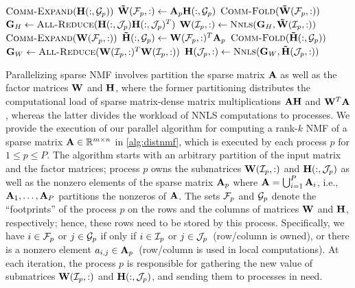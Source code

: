 \begin{algorithm}
\caption{\distspnmf: \distspnmffull}
\label{alg:distnmf}
  \begin{algorithmic}[1]
    \setcounter{ALC@unique}{0}
      \REPEAT
        \STATE $\textsc{Comm-Expand} (\mathbf{H}(:,\mathcal{G}_p))$ \label{line:exph}
        \STATE $\mathbf{\tilde{W}}(\mathcal{F}_p, :) \gets \mathbf{A}_p \mathbf{H}(:, \mathcal{G}_p)$ \label{line:ah}
        \STATE $\textsc{Comm-Fold}(\mathbf{\tilde{W}}(\mathcal{F}_p, :))$ \label{line:foldw}
        \STATE $\mathbf{G}_H \gets \textsc{All-Reduce}(\mathbf{H}(:, \mathcal{J}_p) \mathbf{H}(:, \mathcal{J}_p)^T)$ \label{line:hmgr}
        \STATE $\mathbf{W}(\mathcal{I}_p, :) \gets \textsc{Nnls}(\mathbf{G}_H, \mathbf{\tilde{W}}(\mathcal{I}_p, :))$ \label{line:wmnnls}
        \STATE $\textsc{Comm-Expand}(\mathbf{W}(\mathcal{F}_p, :))$ \label{line:expw}
        \STATE $\mathbf{\tilde{H}}(:, \mathcal{G}_p) \gets \mathbf{W}(\mathcal{F}_p, :)^T \mathbf{A}_p$ \label{line:wta}
        \STATE $\textsc{Comm-Fold}(\mathbf{\tilde{H}}(:, \mathcal{G}_p))$ \label{line:foldh}
        \STATE $\mathbf{G}_W \gets \textsc{All-Reduce}(\mathbf{W}(\mathcal{I}_p, :)^T \mathbf{W}(\mathcal{I}_p, :))$ \label{line:wmgr}
        \STATE $\mathbf{H}(\mathcal{J}_p, :) \gets \textsc{Nnls}(\mathbf{G}_W, \mathbf{\tilde{H}}(\mathcal{J}_p, :))$ \label{line:hmnnls}
  \end{algorithmic}
\end{algorithm}

Parallelizing sparse NMF involves partition the sparse matrix $\mathbf{A}$ as well as the factor matrices $\mathbf{W}$ and $\mathbf{H}$, where the former partitioning distributes the computational load of sparse matrix-dense matrix multiplications $\mathbf{A} \mathbf{H}$ and $\mathbf{W}^T \mathbf{A}$, whereas the latter divides the workload of NNLS computations to processes.
We provide the execution of our parallel algorithm for computing a rank-$k$ NMF of a sparse matrix $\mathbf{A} \in \mathbb{R}^{m \times n}$ in \cref{alg:distnmf}, which is executed by each process $p$ for $1 \le p \le P$.
The algorithm starts with an arbitrary partition of the input matrix and the factor matrices; process $p$ owns the submatrices $\mathbf{W}(\mathcal{I}_p, :)$ and $\mathbf{H}(:, \mathcal{J}_p)$ as well as the nonzero elements of the sparse matrix $\mathbf{A}_p$ where $\mathbf{A} = \bigcup_{i=1}^{P}\mathbf{A}_i$, i.e., $\mathbf{A}_1, \dots, \mathbf{A}_P$ partitions the nonzeros of $\mathbf{A}$.
The sets $\mathcal{F}_p$ and $\mathcal{G}_p$ denote the ``footprints'' of the process $p$ on the rows and the columns of matrices $\mathbf{W}$ and $\mathbf{H}$, respectively; hence, these rows need to be stored by this process.
Specifically, we have $i \in \mathcal{F}_p$ or $j \in \mathcal{G}_p$ if only if $i \in \mathcal{I}_p$ or $j \in \mathcal{J}_p$~(row/column is owned), or there is a nonzero element $a_{i,j} \in \mathbf{A}_p$~(row/column is used in local computations).
At each iteration, the process $p$ is responsible for gathering the new value of submatrices $\mathbf{W}(\mathcal{I}_p, :)$ and $\mathbf{H}(:, \mathcal{J}_p)$, and sending them to processes in need.

